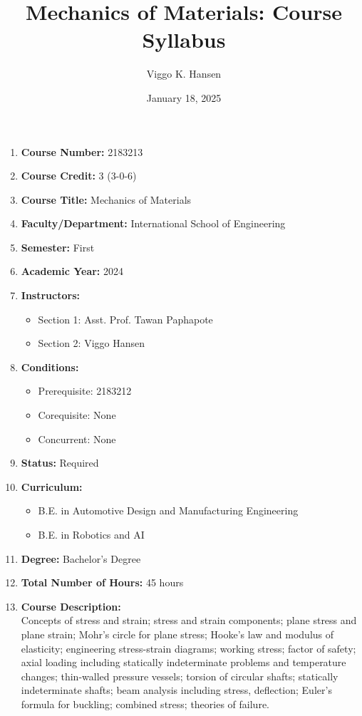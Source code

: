 \documentclass{article}
\title{Mechanics of Materials: Course Syllabus}
\author{Viggo K. Hansen}
\date{January 18, 2025}
\begin{document}
\maketitle

\begin{enumerate}
    \item \textbf{Course Number:} 2183213
    \item \textbf{Course Credit:} 3 (3-0-6)
    \item \textbf{Course Title:} Mechanics of Materials
    \item \textbf{Faculty/Department:} International School of Engineering
    \item \textbf{Semester:} First
    \item \textbf{Academic Year:} 2024
    \item \textbf{Instructors:}
        \begin{itemize}
            \item Section 1: Asst. Prof. Tawan Paphapote
            \item Section 2: Viggo Hansen
        \end{itemize}
    \item \textbf{Conditions:}
        \begin{itemize}
            \item Prerequisite: 2183212
            \item Corequisite: None
            \item Concurrent: None
        \end{itemize}
    \item \textbf{Status:} Required
    \item \textbf{Curriculum:}
        \begin{itemize}
            \item B.E. in Automotive Design and Manufacturing Engineering
            \item B.E. in Robotics and AI
        \end{itemize}
    \item \textbf{Degree:} Bachelor's Degree
    \item \textbf{Total Number of Hours:} 45 hours
    \item \textbf{Course Description:} \\
    Concepts of stress and strain; stress and strain components; plane stress and plane strain; Mohr's circle for plane stress; Hooke's law and modulus of elasticity; engineering stress-strain diagrams; working stress; factor of safety; axial loading including statically indeterminate problems and temperature changes; thin-walled pressure vessels; torsion of circular shafts; statically indeterminate shafts; beam analysis including stress, deflection; Euler's formula for buckling; combined stress; theories of failure.


\end{enumerate}
\end{document}
